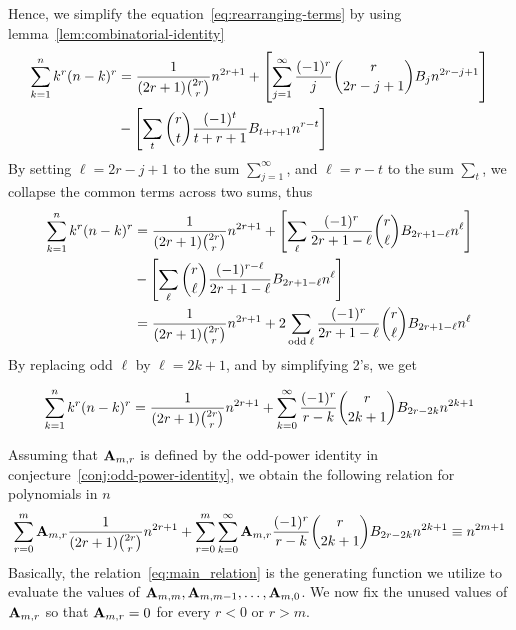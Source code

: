 Hence, we simplify the equation~\eqref{eq:rearranging-terms} by using lemma~\eqref{lem:combinatorial-identity}
\begin{equation*}
    \begin{split}
        \sum_{k=1}^{n} k^{r} (n-k)^{r}
        &= \frac{1}{(2r+1) \binom{2r}r} n^{2r+1}
        + \left[ \sum_{j=1}^{\infty} \frac{(-1)^r}{j} \binom{r}{2r-j+1} {B}\sb{j} n^{2r-j+1} \right] \\
        &- \left[ \sum_{t} \binom{r}{t} \frac{(-1)^t}{t+r+1} {B}\sb{t+r+1} n^{r-t} \right]
    \end{split}
\end{equation*}
By setting $\ell=2r-j+1$ to the sum $\sum_{j=1}^{\infty}$, and $\ell=r-t$ to the sum $\sum_{t}$,
we collapse the common terms across two sums, thus
\begin{align*}
    \sum_{k=1}^{n} k^{r} (n-k)^{r}
    &= \frac{1}{(2r+1) \binom{2r}r} n^{2r+1}
    + \left[ \sum_{\ell} \frac{(-1)^r}{2r+1-\ell} \binom{r}{\ell} {B}\sb{2r+1-\ell} n^{\ell} \right] \\
    &- \left[ \sum_{\ell} \binom{r}{\ell} \frac{(-1)^{r-\ell}}{2r+1-\ell} {B}\sb{2r+1-\ell} n^{\ell} \right]\\
    &= \frac{1}{(2r+1) \binom{2r}r} n^{2r+1} + 2 \sum_{\mathrm{odd \; \ell}} \frac{(-1)^r}{2r+1-\ell} \binom{r}{\ell} {B}\sb{2r+1-\ell} n^{\ell}
\end{align*}
By replacing odd $\ell$ by $\ell = 2k+1$, and by simplifying 2's, we get
\begin{proposition}
    \label{prop:bivariate-faulhabers-formula}
    \begin{align*}
        \sum_{k=1}^{n} k^{r} (n-k)^{r}
        = \frac{1}{(2r+1) \binom{2r}r} n^{2r+1}
        + \sum_{k=0}^{\infty} \frac{(-1)^r}{r-k} \binom{r}{2k+1} {B}\sb{2r-2k} n^{2k+1}
    \end{align*}
\end{proposition}

Assuming that ${\mathbf{A}} \sb{m,r}$ is defined
by the odd-power identity in conjecture~\eqref{conj:odd-power-identity},
we obtain the following relation for polynomials in $n$
\begin{align}
    \label{eq:main_relation}
    \sum_{r=0}^{m} {\mathbf{A}} \sb{m,r} \frac{1}{(2r+1) \binom{2r}{r}} n^{2r+1} + \sum_{r=0}^{m} \sum_{k=0}^{\infty} {\mathbf{A}} \sb{m,r} \frac{(-1)^r}{r-k} \binom{r}{2k+1} {B}\sb{2r-2k} n^{2k+1}  \equiv n^{2m+1}
\end{align}
Basically, the relation~\eqref{eq:main_relation} is the generating function we utilize to
evaluate the values of ${\mathbf{A}} \sb{m,m}, {\mathbf{A}} \sb{m,m-1}, \ldots, {\mathbf{A}} \sb{m,0}$.
We now fix the unused values of ${\mathbf{A}} \sb{m,r}$ so that ${\mathbf{A}} \sb{m,r} = 0$ for every $r < 0$ or $r > m$.


